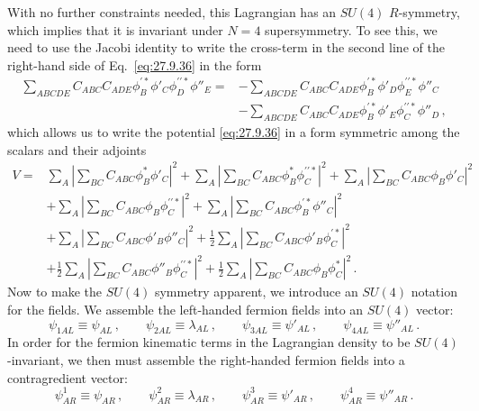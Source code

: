 With no further constraints needed, this Lagrangian has an \(SU(4)\)
\(R\)-symmetry, which implies that it is invariant under \(N=4\)
supersymmetry. To see this, we need to use the Jacobi identity to write the
cross-term in the second line of the right-hand side of Eq.~\eqref{eq:27.9.36}
in the form
\[
  \begin{aligned}
  \sum_{ABCDE}C_{ABC}C_{ADE}
    \phi_B^{\prime *}\phi'_C\phi_D^{\prime\prime *}\phi''_E
  ={}&
  -\sum_{ABCDE}C_{ABC}C_{ADE}
    \phi_B^{\prime *}\phi'_D\phi_E^{\prime\prime *}\phi''_C
  \\
  &-\sum_{ABCDE}C_{ABC}C_{ADE}
    \phi_B^{\prime *}\phi'_E\phi_C^{\prime\prime *}\phi''_D\,,
  \end{aligned}
\]
which allows us to write the potential \eqref{eq:27.9.36} in a form symmetric
among the scalars and their adjoints
\begin{equation}
  \begin{aligned}
  V={}&
  \sum_A\left|\sum_{BC}C_{ABC}\phi_B^*\phi'_C\right|^2
  +\sum_A\left|\sum_{BC}C_{ABC}\phi_B^*\phi_C^{\prime\prime *}\right|^2
  +\sum_A\left|\sum_{BC}C_{ABC}\phi_B\phi'_C\right|^2
  \\
  &+\sum_A\left|\sum_{BC}C_{ABC}\phi_B\phi_C^{\prime\prime *}\right|^2
  +\sum_A\left|\sum_{BC}C_{ABC}\phi_B^{\prime *}\phi''_C\right|^2
  \\
  &+\sum_A\left|\sum_{BC}C_{ABC}\phi'_B\phi''_C\right|^2
  +\frac12\sum_A\left|\sum_{BC}C_{ABC}\phi'_B\phi_C^{\prime *}\right|^2
  \\
  &+\frac12\sum_A\left|\sum_{BC}C_{ABC}\phi''_B
    \phi_C^{\prime\prime *}\right|^2
  +\frac12\sum_A\left|\sum_{BC}C_{ABC}\phi_B\phi_C^*\right|^2\,.
  \end{aligned}
  \tag{27.9.37}\label{eq:27.9.37}
\end{equation}
Now to make the \(SU(4)\) symmetry apparent, we introduce an \(SU(4)\)
notation for the fields. We assemble the left-handed fermion fields into an
\(SU(4)\) vector:
\begin{equation}
  \psi_{1AL}\equiv\psi_{AL}\,,
  \qquad
  \psi_{2AL}\equiv\lambda_{AL}\,,
  \qquad
  \psi_{3AL}\equiv\psi'_{AL}\,,
  \qquad
  \psi_{4AL}\equiv\psi''_{AL}\,.
  \tag{27.9.38}\label{eq:27.9.38}
\end{equation}
In order for the fermion kinematic terms in the Lagrangian density to be
\(SU(4)\)-invariant, we then must assemble the right-handed fermion fields
into a contragredient vector:
\begin{equation}
  \psi^1_{AR}\equiv\psi_{AR}\,,
  \qquad
  \psi^2_{AR}\equiv\lambda_{AR}\,,
  \qquad
  \psi^3_{AR}\equiv\psi'_{AR}\,,
  \qquad
  \psi^4_{AR}\equiv\psi''_{AR}\,.
  \tag{27.9.39}\label{eq:27.9.39}
\end{equation}
